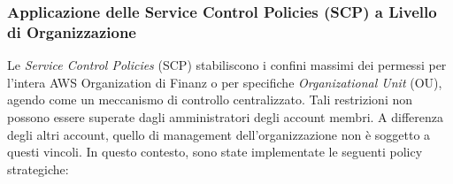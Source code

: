 \subsubsection{Applicazione delle Service Control Policies (SCP) a Livello di Organizzazione}
\label{subsubsec:scp_livello_organizzazione}

Le \emph{Service Control Policies} (SCP) stabiliscono i confini massimi dei permessi per l'intera AWS Organization di Finanz o per specifiche \emph{Organizational Unit} (OU), agendo come un meccanismo di controllo centralizzato. Tali restrizioni non possono essere superate dagli amministratori degli account membri. A differenza degli altri account, quello di management dell'organizzazione non è soggetto a questi vincoli. In questo contesto, sono state implementate le seguenti policy strategiche:

